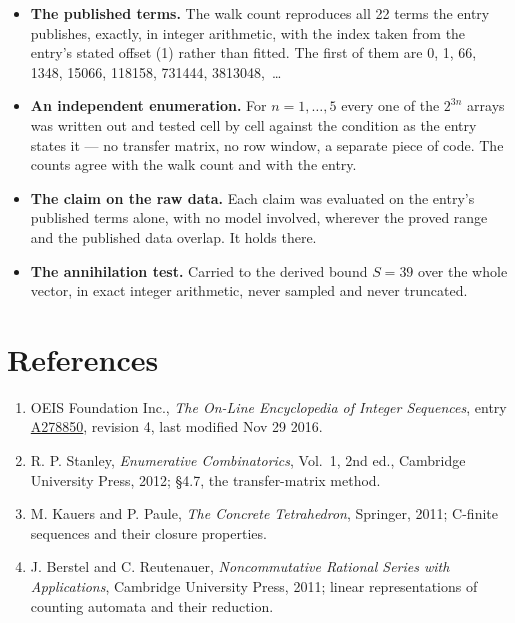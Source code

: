 \documentclass[11pt]{article}
\theoremstyle{definition}
\begin{document}
\begin{itemize}

\item {\bfseries The published terms.} The walk count reproduces all 22 terms the entry publishes, exactly, in integer arithmetic, with the index taken from the entry's stated offset (1) rather than fitted. The first of them are 0, 1, 66, 1348, 15066, 118158, 731444, 3813048,~\dots

\item {\bfseries An independent enumeration.} For $n = 1,\dots,5$ every one of the $2^{3n}$ arrays was written out and tested cell by cell against the condition as the entry states it --- no transfer matrix, no row window, a separate piece of code. The counts agree with the walk count and with the entry.

\item {\bfseries The claim on the raw data.} Each claim was evaluated on the entry's published terms alone, with no model involved, wherever the proved range and the published data overlap. It holds there.

\item {\bfseries The annihilation test.} Carried to the derived bound $S = 39$ over the whole vector, in exact integer arithmetic, never sampled and never truncated.

\end{itemize}

\section{References}

\begin{enumerate}

\item OEIS Foundation Inc., \emph{The On-Line Encyclopedia of Integer Sequences}, entry \href{https://oeis.org/A278850}{A278850}, revision 4, last modified Nov 29 2016.

\item R. P. Stanley, \emph{Enumerative Combinatorics}, Vol.~1, 2nd ed., Cambridge University Press, 2012; \S4.7, the transfer-matrix method.

\item M. Kauers and P. Paule, \emph{The Concrete Tetrahedron}, Springer, 2011; C-finite sequences and their closure properties.

\item J. Berstel and C. Reutenauer, \emph{Noncommutative Rational Series with Applications}, Cambridge University Press, 2011; linear representations of counting automata and their reduction.

\end{enumerate}
\end{document}
